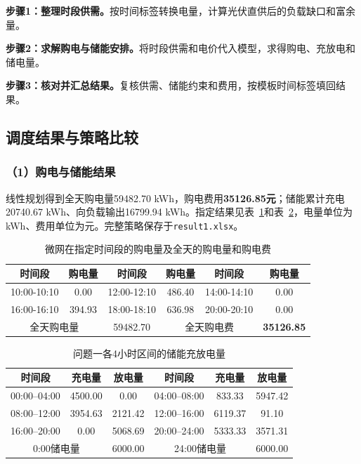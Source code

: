 \noindent\textbf{步骤1：整理时段供需。}按时间标签转换电量，计算光伏直供后的负载缺口和富余量。

\noindent\textbf{步骤2：求解购电与储能安排。}将时段供需和电价代入模型，求得购电、充放电和储电量。

\noindent\textbf{步骤3：核对并汇总结果。}复核供需、储能约束和费用，按模板时间标签填回结果。

\subsection{调度结果与策略比较}
\subsubsection*{（1）购电与储能结果}
线性规划得到全天购电量59482.70 kWh，购电费用\textbf{35126.85元}；储能累计充电20740.67 kWh、向负载输出16799.94 kWh。指定结果见表~\ref{tab:q1_purchase_result}和表~\ref{tab:q1_storage_result}，电量单位为kWh、费用单位为元。完整策略保存于\texttt{result1.xlsx}。

\begin{table}[!htbp]
    \centering
    \caption{微网在指定时间段的购电量及全天的购电量和购电费 }
    \label{tab:q1_purchase_result}
    \begin{tabular}{|c|c|c|c|c|c|}
        \hline
        时间段 & 购电量 & 时间段 & 购电量 & 时间段 & 购电量 \\
        \hline
        10:00-10:10 & 0.00 & 12:00-12:10 & 486.40 & 14:00-14:10 & 0.00 \\
        \hline
        16:00-16:10 & 394.93 & 18:00-18:10 & 636.98 & 20:00-20:10 & 0.00 \\
        \hline
        \multicolumn{2}{|c|}{全天购电量} & \multicolumn{1}{c|}{59482.70} & \multicolumn{2}{c|}{全天购电费} & \multicolumn{1}{c|}{\textbf{35126.85}}\\
        \hline
    \end{tabular}
\end{table}

\begin{table}[!htbp]
    \centering
    \caption{问题一各4小时区间的储能充放电量}
    \label{tab:q1_storage_result}
    \begin{tabular}{|c|c|c|c|c|c|}
        \hline
        时间段 & 充电量 & 放电量 & 时间段 & 充电量 & 放电量 \\
        \hline
        00:00--04:00 & 4500.00 & 0.00 & 04:00--08:00 & 833.33 & 5947.42 \\
        \hline
        08:00--12:00 & 3954.63 & 2121.42 & 12:00--16:00 & 6119.37 & 91.10 \\
        \hline
        16:00--20:00 & 0.00 & 5068.69 & 20:00--24:00 & 5333.33 & 3571.31 \\
        \hline
        \multicolumn{2}{|c|}{0:00储电量} & \multicolumn{1}{|c|}{6000.00} & \multicolumn{2}{c|}{24:00储电量} & \multicolumn{1}{c|}{6000.00}\\
        \hline
    \end{tabular}
\end{table}


